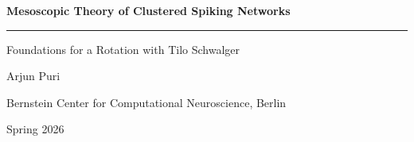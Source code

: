 \begin{titlepage}
  \centering
  \vspace*{2.6cm}

  {\sffamily\Huge\bfseries Mesoscopic Theory of Clustered Spiking Networks}

  \vspace{0.6cm}
  {\rule{0.46\textwidth}{0.6pt}}

  \vspace{0.6cm}
  {\sffamily\Large Foundations for a Rotation with Tilo Schwalger}

  \vspace{2.2cm}
  {\large Arjun Puri}

  \vspace{0.4cm}
  {\normalsize Bernstein Center for Computational Neuroscience, Berlin}

  \vfill

  {\small Spring 2026}

  \vspace{1cm}
\end{titlepage}
